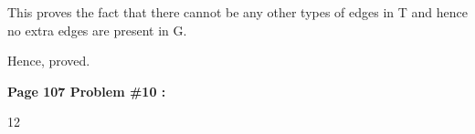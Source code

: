 \documentclass[letterpaper,portrait,12pt]{article}
\begin{document}
\begin{flushleft}

\end{flushleft}


\begin{flushleft}
This proves the fact that there cannot be any other types of edges in T and hence no extra edges are present in G.
\end{flushleft}


\begin{flushleft}

\end{flushleft}


\begin{flushleft}
Hence, proved.
\end{flushleft}


\begin{flushleft}

\end{flushleft}


\begin{flushleft}
\textbf{Page 107 Problem \#10 :}
\end{flushleft}


\begin{flushleft}

\end{flushleft}


\begin{flushleft}

\end{flushleft}


\begin{flushleft}

\end{flushleft}


\begin{center}

\end{center}


\begin{center}

\end{center}


\begin{center}

\end{center}




12
\end{document}
